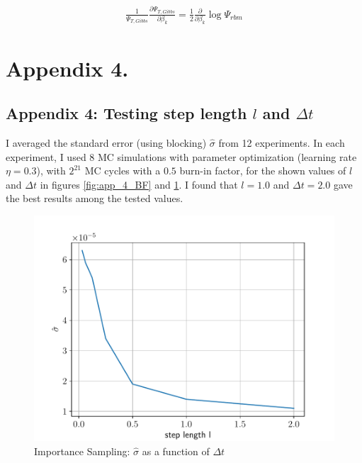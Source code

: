 \documentclass[%
oneside,                 %
final,                   %
10pt]{article}
\begin{document}
\begin{appendices}
\begin{equation}
\begin{aligned}
 \frac{1}{\Psi_{T,Gibbs} }\frac{\partial \Psi_{T,Gibbs} }{\partial \beta_k}=\frac{1}{2}\frac{\partial}{\partial \beta_k} \log \Psi_{rbm}
\end{aligned}
\end{equation}

\section{Appendix 4.} \label{APP_3}
\subsection{Appendix 4: Testing step length $l$ and $\Delta t$}
 I averaged the standard error (using blocking) $\hat \sigma$ from 12 experiments. In each experiment, I used $8$ MC simulations with parameter optimization (learning rate $\eta =0.3$), with $2^{21}$ MC cycles with a $0.5$ burn-in factor, for the shown values of $l$ and $\Delta t$ in figures \ref{fig:app_4_BF} and  \ref{fig:app_4_IS}.
I found that $l=1.0$ and $\Delta t = 2.0$ gave the best results among the tested values.
\begin{figure}[!h]
        \centering 
         \includegraphics[scale=0.6]{../Results/sim_2/error.pdf} 
        \caption{Importance Sampling: $\hat \sigma$ as a function of $\Delta t$}
        \label{fig:app_4_IS}   
\end{figure}  


\end{appendices}
\end{document}
